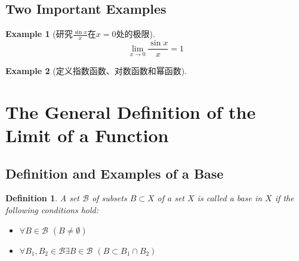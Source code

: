 \documentclass[onecolumn]{ctexart}
\newtheorem{definition}{Definition}
\newtheorem{example}{Example}
\begin{document}
\subsection{Two Important Examples}

\begin{example}[研究$\frac{\sin x}{x}$在$x=0$处的极限]
  \begin{equation}
    \lim_{x \to 0} \frac{\sin x}{x} = 1
  \end{equation}
\end{example}

\begin{example}[定义指数函数、对数函数和幂函数]
  
\end{example}

\section{The General Definition of the Limit of a Function}

\subsection{Definition and Examples of a Base}

\begin{definition}
  A set $\mathcal{B}$ of subsets $B \subset X$ of a set $X$ is called a base in 
  $X$ if the following conditions hold:
  \begin{itemize}
    \item $\forall B \in \mathcal{B}$ $(B \neq \emptyset)$
    \item $\forall B_1, B_2 \in \mathcal{B} \exists B \in \mathcal{B}$ $(B 
    \subset B_1 \cap B_2)$
  \end{itemize}
\end{definition}
\end{document}
